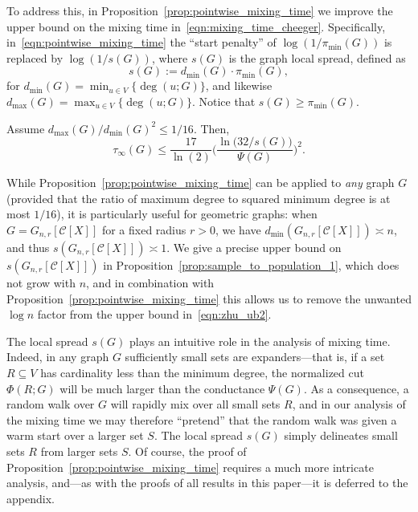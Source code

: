 \documentclass[11pt,twoside]{article}
\newcommand{\1}{\mathbf{1}}
\newcommand{\mc}[1]{\mathcal{#1}}
\begin{document}
To address this, in Proposition~\ref{prop:pointwise_mixing_time} we improve the upper bound on the mixing time in~\eqref{eqn:mixing_time_cheeger}. Specifically, in~\eqref{eqn:pointwise_mixing_time} the ``start penalty'' of $\log(1/\pi_{\min}(G))$ is replaced by $\log(1/s(G))$, where $s(G)$ is the graph local spread, defined as
\begin{equation*}
s(G) := d_{\min}(G) \cdot \pi_{\min}(G),
\end{equation*}
for $d_{\min}(G) = \min_{u \in V}\bigl\{\deg(u;G)\bigr\}$, and likewise $d_{\max}(G) = \max_{u \in V}\bigl\{\deg(u;G)\bigr\}$. Notice that $s(G) \geq \pi_{\min}(G)$.
\begin{proposition}
	\label{prop:pointwise_mixing_time}
	Assume $d_{\max}(G)/d_{\min}(G)^2 \leq 1/16$. Then,
	\begin{equation}
	\label{eqn:pointwise_mixing_time}
	\tau_{\infty}(G) \leq \frac{17}{\ln(2)} \biggl(\frac{\ln\bigl(32/s(G)\bigr)}{\Psi(G)}\biggr)^2.
	\end{equation}
\end{proposition}

While Proposition~\ref{prop:pointwise_mixing_time} can be applied to \emph{any} graph $G$ (provided that the ratio of maximum degree to squared minimum degree is at most $1/16$), it is particularly useful for geometric graphs: when $G = G_{n,r}[\mc{C}[X]]$ for a fixed radius $r > 0$, we have $d_{\min}(G_{n,r}[\mc{C}[X]]) \asymp n$, and thus $s(G_{n,r}[\mc{C}[X]]) \asymp 1$. We give a precise upper bound on $s(G_{n,r}[\mc{C}[X]])$ in Proposition~\ref{prop:sample_to_population_1}, which does not grow with $n$, and in combination with Proposition~\ref{prop:pointwise_mixing_time} this allows us to remove the unwanted $\log n$ factor from the upper bound in~\eqref{eqn:zhu_ub2}. 

The local spread $s(G)$ plays an intuitive role in the analysis of mixing time. Indeed, in any graph $G$ sufficiently small sets are expanders---that is, if a set $R \subseteq V$ has cardinality less than the minimum degree, the normalized cut $\Phi(R;G)$ will be much larger than the conductance $\Psi(G)$. As a consequence, a random walk over $G$ will rapidly mix over all small sets $R$, and in our analysis of the mixing time we may therefore ``pretend'' that the random walk was given a warm start over a larger set $S$. The local spread $s(G)$ simply delineates small sets $R$ from larger sets $S$. Of course, the proof of Proposition~\ref{prop:pointwise_mixing_time} requires a much more intricate analysis, and---as with the proofs of all results in this paper---it is deferred to the appendix.
\end{document}
